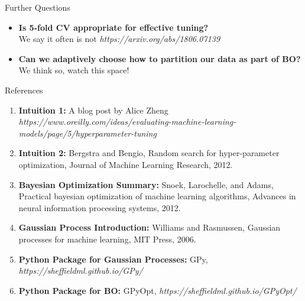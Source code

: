 \documentclass{beamer}
\begin{document}
\begin{frame}{Further Questions}
	\begin{block}{}
		\begin{itemize}
			\item \textbf{Is 5-fold CV appropriate for effective tuning?} \\
			We say it often is not \textit{https://arxiv.org/abs/1806.07139}
			\item \textbf{Can we adaptively choose how to partition our data as part of BO?} \\
			We think so, watch this space!
					
		\end{itemize}
	\end{block}
\end{frame}
\begin{frame}
	\begin{block}{References}
		\begin{enumerate}
			\item \textbf{Intuition 1:} A blog post by Alice Zheng \textit{https://www.oreilly.com/ideas/evaluating-machine-learning-models/page/5/hyperparameter-tuning}
			\item \textbf{Intuition 2:} Bergstra and Bengio, Random search for hyper-parameter optimization, Journal of Machine Learning Research, 2012.
			\item \textbf{Bayesian Optimization Summary:} Snoek, Larochelle, and Adams, Practical bayesian optimization of machine learning algorithms, Advances in neural information processing systems, 2012.
			\item \textbf{Gaussian Process Introduction:} Williams and Rasmussen, Gaussian processes for machine learning, MIT Press, 2006.
			\item \textbf{Python Package for Gaussian Processes:} GPy, \textit{https://sheffieldml.github.io/GPy/} 
			\item \textbf{Python Package for BO:} GPyOpt, \textit{https://sheffieldml.github.io/GPyOpt/}
		\end{enumerate}
	\end{block}
\end{frame}
\end{document}
